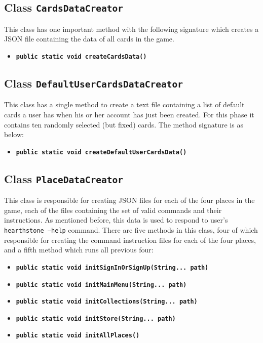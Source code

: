 \documentclass[a4paper]{article}
\begin{document}
\subsection{Class \texttt{CardsDataCreator}}
This class has one important method with the following signature which creates a JSON file containing the data of all cards in the game.
\begin{itemize}
	\item \texttt{\textbf{public static void createCardsData()}}
\end{itemize}

\subsection{Class \texttt{DefaultUserCardsDataCreator}}
This class has a single method to create a text file containing a list of default cards a user has when his or her account has just been created. For this phase it contains ten randomly selected (but fixed) cards. The method signature is as below:
\begin{itemize}
	\item \texttt{\textbf{public static void createDefaultUserCardsData()}}
\end{itemize}

\subsection{Class \texttt{PlaceDataCreator}}
This class is responsible for creating JSON files for each of the four places in the game, each of the files containing the set of valid commands and their instructions. As mentioned before, this data is used to respond to user's \texttt{hearthstone --help} command. There are five methods in this class, four of which responsible for creating the command instruction files for each of the four places, and a fifth method which runs all previous four:
\begin{itemize}
	\item \texttt{\textbf{public static void initSignInOrSignUp(String... path)}}
	\item \texttt{\textbf{public static void initMainMenu(String... path)}}
	\item \texttt{\textbf{public static void initCollections(String... path)}}
	\item \texttt{\textbf{public static void initStore(String... path)}}
	\item \texttt{\textbf{public static void initAllPlaces()}}
\end{itemize}
\end{document}
